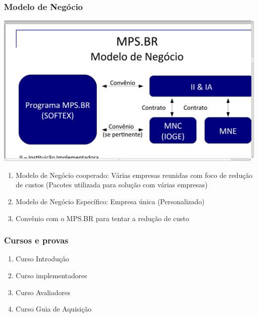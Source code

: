 \documentclass{article}
\begin{document}
\subsubsection{Modelo de Negócio}
	\begin{center}
		\includegraphics[scale=0.25]{MPSBR_modelo_negocios}
	\end{center}	
	\begin{enumerate}
	\item Modelo de Negócio cooperado: Várias empresas reunidas com foco de redução de custos (Pacotes utilizada para solução com várias empresas)
	\item Modelo de Negócio Específico: Empresa única (Personalizado)
	\item Convênio com o MPS.BR para tentar a redução de custo 	
	\end{enumerate}

\subsubsection{Cursos e provas}
	\begin{enumerate}
	\item Curso Introdução
	\item Curso implementadores
	\item Curso Avaliadores
	\item Curso Guia de Aquisição
	\end{enumerate}		
\end{document}

